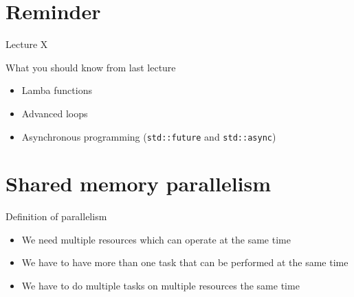 \documentclass[12pt,t]{beamer}
\title{\coursename}
\subtitle{Lecture 7: Shared memory  parallelism}
\date {
 \tiny \url{\courseurl}
\vspace{2cm}
\doclicenseThis  
  
}
\begin{document}
 {
    \frame {
        \titlepage
    }
}

\frame{

\tableofcontents

}


\section{Reminder}
\begin{frame}{Lecture X}
\begin{block}{What you should know from last lecture}
\begin{itemize}
\item Lamba functions
\item Advanced loops
\item Asynchronous programming (\lstinline|std::future| and \lstinline|std::async|)
\end{itemize}
\end{block}
\end{frame}

\section{Shared memory parallelism}

\begin{frame}{Definition of parallelism}

\begin{itemize}
\item We need multiple resources which can operate at the same time
\item We have to have more than one task that can be performed at the same time
\item We have to do multiple tasks on multiple resources the same time
\end{itemize}

\end{frame}
\end{document}
